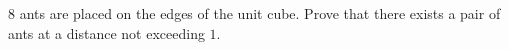 $8$ ants are placed on the edges of the unit cube. Prove that there exists a pair of ants at a distance not exceeding $1$.